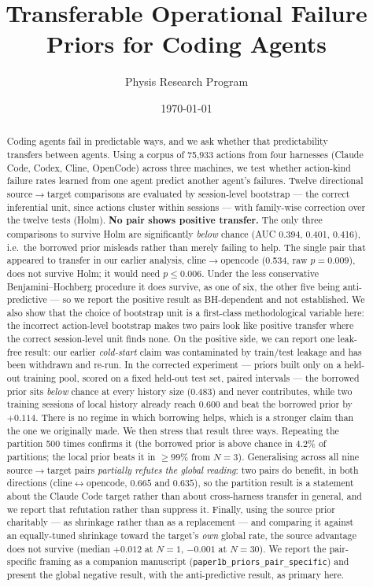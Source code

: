 \documentclass[11pt]{article}
\title{Transferable Operational Failure Priors for Coding Agents}
\author{Physis Research Program}
\date{\today}
\begin{document}
\maketitle

\begin{abstract}
Coding agents fail in predictable ways, and we ask whether that
predictability transfers between agents. Using a corpus of 75,933 actions
from four harnesses (Claude Code, Codex, Cline, OpenCode) across three
machines, we test whether action-kind failure rates learned from one agent
predict another agent's failures. Twelve directional source$\to$target
comparisons are evaluated by session-level bootstrap --- the correct
inferential unit, since actions cluster within sessions --- with
family-wise correction over the twelve tests (Holm). \textbf{No pair shows
positive transfer.} The only three comparisons to survive Holm are
significantly \emph{below} chance (AUC 0.394, 0.401, 0.416), i.e.\ the
borrowed prior misleads rather than merely failing to help. The single
pair that appeared to transfer in our earlier analysis,
cline$\to$opencode (0.534, raw $p = 0.009$), does not survive Holm; it
would need $p \le 0.006$. Under the less conservative
Benjamini--Hochberg procedure it does survive, as one of six, the other
five being anti-predictive --- so we report the positive result as
BH-dependent and not established. We also show that the choice of
bootstrap unit is a first-class methodological variable here: the
incorrect action-level bootstrap makes two pairs look like positive
transfer where the correct session-level unit finds none. On the positive
side, we can report one leak-free result: our earlier \emph{cold-start} claim
was contaminated by train/test leakage and has been withdrawn and re-run. In
the corrected experiment --- priors built only on a held-out training pool,
scored on a fixed held-out test set, paired intervals --- the borrowed prior
sits \emph{below} chance at every history size (0.483) and never contributes,
while two training sessions of local history already reach 0.600 and beat the
borrowed prior by $+0.114$. There is no regime in which borrowing helps,
which is a stronger claim than the one we originally made. We then stress that
result three ways. Repeating the partition 500 times confirms it (the borrowed
prior is above chance in $4.2\%$ of partitions; the local prior beats it in
$\geq 99\%$ from $N=3$). Generalising across all nine source$\to$target pairs
\emph{partially refutes the global reading}: two pairs do benefit, in both
directions (cline$\leftrightarrow$opencode, $0.665$ and $0.635$), so the
partition result is a statement about the Claude Code target rather than about
cross-harness transfer in general, and we report that refutation rather than
suppress it. Finally, using the source prior charitably --- as shrinkage rather
than as a replacement --- and comparing it against an equally-tuned shrinkage
toward the target's \emph{own} global rate, the source advantage does not
survive (median $+0.012$ at $N=1$, $-0.001$ at $N=30$). We report the
pair-specific framing as a companion manuscript
(\texttt{paper1b\_priors\_pair\_specific}) and present the global negative
result, with the anti-predictive result, as primary here.
\end{abstract}
\end{document}
